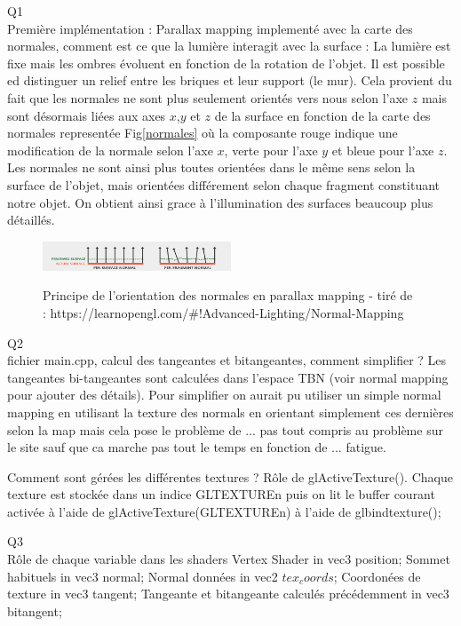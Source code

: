\documentclass[a4paper]{article}
\begin{document}
Q1\\
Première implémentation : Parallax mapping implementé avec la carte des normales, comment est ce que la lumière interagit avec la surface : 
La lumière est fixe mais les ombres évoluent en fonction de la rotation de l'objet. Il est possible ed distinguer un relief entre les briques et leur support (le mur). Cela provient du fait que les normales ne sont plus seulement orientés vers nous selon l'axe $z$ mais sont désormais liées aux axes $x$,$y$ et $z$ de la surface en fonction de la carte des normales representée Fig\ref{normales} où la composante rouge indique une modification de la normale selon l'axe $x$, verte pour l'axe $y$ et bleue pour l'axe $z$. Les normales ne sont ainsi plus toutes orientées dans le même sens selon la surface de l'objet, mais orientées différement selon chaque fragment constituant notre objet. On obtient ainsi grace à l'illumination des surfaces beaucoup plus détaillés.

\begin{figure}[H]
\centering
\includegraphics[width=0.5\textwidth]{figures/normalsOrientation.png}\label{normalOrientation}
\caption{Principe de l'orientation des normales en parallax mapping - tiré de :  https://learnopengl.com/\#!Advanced-Lighting/Normal-Mapping}
\end{figure}




Q2\\
fichier main.cpp, calcul des tangeantes et bitangeantes, comment simplifier ? 
Les tangeantes bi-tangeantes sont calculées dans l'espace TBN (voir normal mapping pour ajouter des détails). Pour simplifier on aurait pu utiliser un simple normal mapping en utilisant la texture des normals en orientant simplement ces dernières selon la map mais cela pose le problème de ... pas tout compris au problème sur le site sauf que ca marche pas tout le temps en fonction de ...  fatigue. 

Comment sont gérées les différentes textures ? Rôle de glActiveTexture().
Chaque texture est stockée dans un indice GLTEXTUREn puis on lit le buffer courant activée à l'aide de glActiveTexture(GLTEXTUREn) à l'aide de glbindtexture();

Q3\\  
Rôle de chaque variable dans les shaders
Vertex Shader
in vec3 position; Sommet habituels
in vec3 normal; Normal données
in vec2 $tex_coords$; Coordonées de texture
in vec3 tangent; Tangeante et bitangeante calculés précédemment
in vec3 bitangent;
\end{document}
